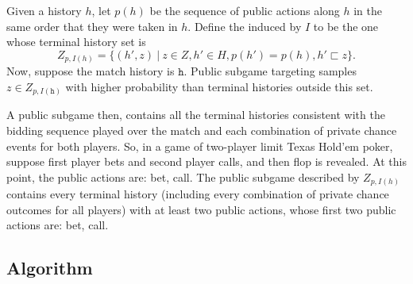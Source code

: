 \documentclass[letterpaper]{article}
\newcommand{\tth}{\mathtt{h}}
\newcommand{\defword}[1]{\textbf{\boldmath{#1}}}
\begin{document}
Given a history $h$, let $p(h)$ be the sequence of public actions along $h$ in the same order that they were taken in $h$. 
Define the \defword{public subgame} induced by $I$ to be the one whose terminal history set is
\[Z_{p,I(h)} = \{(h',z)~|~z \in Z, h' \in H, p(h') = p(h), h' \sqsubset z \}.\]
Now, suppose the match history is $\tth$.
Public subgame targeting samples $z \in Z_{p,I(\tth)}$ with higher probability than terminal histories outside this set.

A public subgame then, contains all the terminal histories consistent with the bidding sequence played over the match and
each combination of private chance events for both players. So, in a game of two-player limit Texas Hold'em poker, suppose 
first player bets and second player calls, and then flop is revealed. At this point, the public actions are: bet, call. 
The public subgame described by $Z_{p,I(h)}$ contains every terminal history (including every combination of private chance 
outcomes for all players) with at least two public actions, whose first two public actions are: bet, call.  


\subsection{Algorithm}
\end{document}
